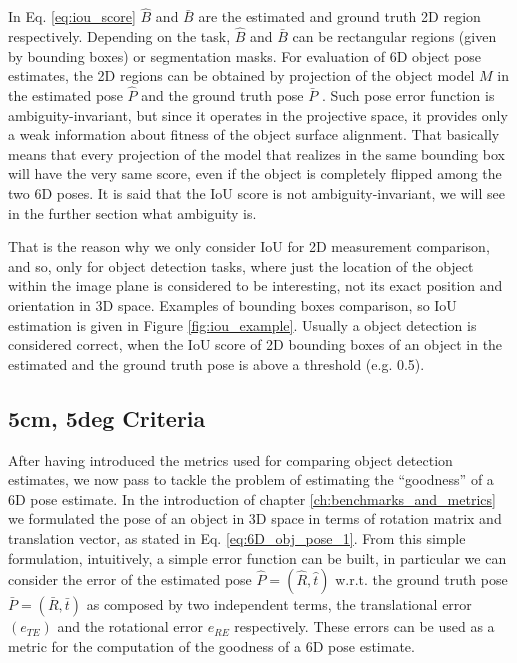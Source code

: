 In Eq. \ref{eq:iou_score} $\hat{B}$ and $\bar{B}$ are the estimated and ground truth 2D region respectively. Depending on the task, $\hat{B}$ and $\bar{B}$ can be rectangular regions (given by bounding boxes) or segmentation masks. For evaluation of 6D object pose estimates, the 2D regions can be obtained by projection of the object model $\mathit{M}$ in the estimated pose $\hat{P}$ and the ground truth pose $\bar{P}$ . Such pose error function is ambiguity-invariant, but since it operates in the projective space, it provides only a weak information about fitness of the object surface alignment. That basically means that every projection of the model that realizes in the same bounding box will have the very same score, even if the object is completely flipped among the two 6D poses. It is said that the IoU score is not ambiguity-invariant, we will see in the further section what ambiguity is. 

That is the reason why we only consider IoU for 2D measurement comparison, and so, only for object detection tasks, where just the location of the object within the image plane is considered to be interesting, not its exact position and orientation in 3D space. Examples of bounding boxes comparison, so IoU estimation is given in Figure \ref{fig:iou_example}. Usually a object detection is considered correct, when the IoU score of 2D bounding boxes of an object in the estimated and the ground truth pose is above a
threshold (e.g. 0.5).

\subsection{5cm, 5deg Criteria}\label{subsec:5cm5deg}
After having introduced the metrics used for comparing object detection estimates, we now pass to tackle the problem of estimating the ``goodness'' of a 6D pose estimate. In the introduction of chapter \ref{ch:benchmarks_and_metrics} we formulated the pose of an object in 3D space in terms of rotation  matrix and translation vector, as stated in Eq. \ref{eq:6D_obj_pose_1}. From this simple formulation, intuitively, a simple error function can be built, in particular we can consider the error of the estimated pose $\hat{P} = (\hat{R}, \hat{t})$ w.r.t. the ground truth pose $\bar{P} = (\bar{R}, \bar{t})$ as composed by two independent terms, the translational error $(e_{TE})$ and the rotational error $e_{RE}$ respectively. These errors can be used as a metric for the computation of the goodness of a 6D pose estimate.

